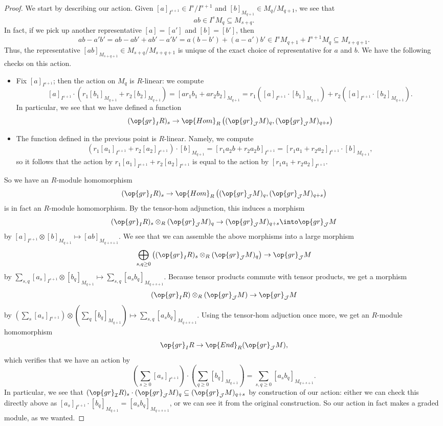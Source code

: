 \begin{proof}
	We start by describing our action. Given $[a]_{I^{s+1}}\in I^s/I^{s+1}$ and $[b]_{M_{q+1}}\in M_q/M_{q+1}$, we see that
	\[ab\in I^sM_q\subseteq M_{s+q}.\]
	In fact, if we pick up another representative $[a]=[a']$ and $[b]=[b']$, then
	\[ab-a'b'=ab-ab'+ab'-a'b'=a(b-b')+(a-a')b'\in I^sM_{q+1}+I^{s+1}M_q\subseteq M_{s+q+1}.\]
	Thus, the representative $[ab]_{M_{s+q+1}}\in M_{s+q}/M_{s+q+1}$ is unique of the exact choice of representative for $a$ and $b$. We have the following checks on this action.
	\begin{itemize}
		\item Fix $[a]_{I^{s+1}}$; then the action on $M_q$ is $R$-linear: we compute
		\[[a]_{I^{s+1}}\cdot\left(r_1[b_1]_{M_{q+1}}+r_2[b_2]_{M_{q+1}}\right)=[ar_1b_1+ar_2b_2]_{M_{q+1}}=r_1\left([a]_{I^{s+1}}\cdot[b_1]_{M_{q+1}}\right)+r_2\left([a]_{I^{s+1}}\cdot[b_2]_{M_{q+1}}\right).\]
		In particular, we see that we have defined a function
		\[(\op{gr}_IR)_s\to\op{Hom}_R\left((\op{gr}_\mathcal JM)_q,(\op{gr}_\mathcal JM)_{q+s}\right)\]
		\item The function defined in the previous point is $R$-linear. Namely, we compute
		\[\left(r_1[a_1]_{I^{s+1}}+r_2[a_2]_{I^{s+1}}\right)\cdot[b]_{M_{q+1}}=[r_1a_2b+r_2a_2b]_{I^{s+1}}=[r_1a_1+r_2a_2]_{I^{s+1}}\cdot[b]_{M_{q+1}},\]
		so it follows that the action by $r_1[a_1]_{I^{s+1}}+r_2[a_2]_{I^{s+1}}$ is equal to the action by $[r_1a_1+r_2a_2]_{I^{s+1}}$.
	\end{itemize}
	So we have an $R$-module homomorphism
	\[(\op{gr}_IR)_s\to\op{Hom}_R\left((\op{gr}_\mathcal JM)_q,(\op{gr}_\mathcal JM)_{q+s}\right)\]
	is in fact an $R$-module homomorphism. By the tensor-hom adjunction, this induces a morphism
	\[(\op{gr}_IR)_s\otimes_R(\op{gr}_\mathcal JM)_q\to(\op{gr}_\mathcal JM)_{q+s}\into\op{gr}_\mathcal JM\]
	by $[a]_{I^{s+1}}\otimes[b]_{M_{q+1}}\mapsto[ab]_{M_{q+s+1}}$. We see that we can assemble the above morphisms into a large morphism
	\[\bigoplus_{s,q\ge0}\left((\op{gr}_IR)_s\otimes_R(\op{gr}_\mathcal JM)_q\right)\to\op{gr}_\mathcal JM\]
	by $\sum_{s,q}[a_s]_{I^{s+1}}\otimes[b_q]_{M_{q+1}}\mapsto\sum_{s,q}[a_sb_q]_{M_{q+s+1}}$. Because tensor products commute with tensor products, we get a morphism
	\[(\op{gr}_IR)\otimes_R(\op{gr}_\mathcal JM)\to\op{gr}_\mathcal JM\]
	by $\left(\sum_s[a_s]_{I^{s+1}}\right)\otimes\left(\sum_q[b_q]_{M_{q+1}}\right)\mapsto\sum_{s,q}[a_sb_q]_{M_{q+s+1}}$. Using the tensor-hom adjuction once more, we get an $R$-module homomorphism
	\[\op{gr}_IR\to\op{End}_R(\op{gr}_\mathcal JM),\]
	which verifies that we have an action by
	\[\left(\sum_{s\ge0}[a_s]_{I^{s+1}}\right)\cdot\left(\sum_{q\ge0}[b_q]_{M_{q+1}}\right)=\sum_{s,q\ge0}[a_sb_q]_{M_{q+s+1}}.\]
	In particular, we see that $(\op{gr}_\mathcal IR)_s\cdot(\op{gr}_\mathcal JM)_q\subseteq(\op{gr}_\mathcal JM)_{q+s}$ by construction of our action: either we can check this directly above as $[a_s]_{I^{s+1}}\cdot[b_q]_{M_{q+1}}=[a_sb_q]_{M_{q+s+1}}$, or we can see it from the original construction. So our action in fact makes a graded module, as we wanted.
\end{proof}
